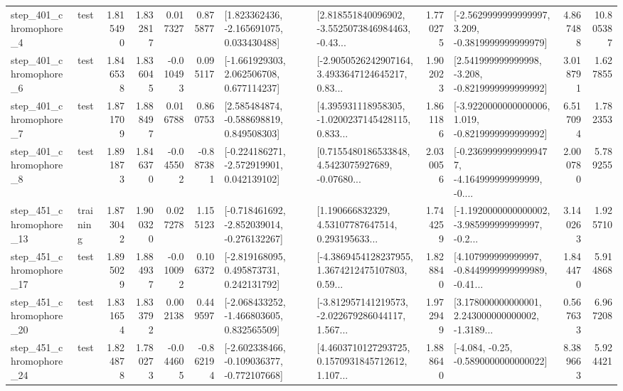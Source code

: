 \begin{tabular}{llrrrrllrlrr}
   step\_401\_chromophore\_4 &      test &      1.815490 &    1.832817 &      0.017327 &  0.875877 &    [1.823362436, -2.165691075, 0.033430488] &  [2.818551840096902, -3.5525073846984463, -0.43... &       1.770275 &  [-2.5629999999999997, 3.209, -0.3819999999999979] &            4.867488 &         10.805387 \\
   step\_401\_chromophore\_6 &      test &      1.846538 &    1.836045 &     -0.010493 &  0.095117 &    [-1.661929303, 2.062506708, 0.677114237] &  [-2.9050526242907164, 3.4933647124645217, 0.83... &       1.902023 &   [2.541999999999998, -3.208, -0.8219999999999992] &            3.018791 &          1.627855 \\
   step\_401\_chromophore\_7 &      test &      1.871709 &    1.888497 &      0.016788 &  0.860753 &    [2.585484874, -0.588698819, 0.849508303] &  [4.395931118958305, -1.0200237145428115, 0.833... &       1.861186 &  [-3.9220000000000006, 1.019, -0.8219999999999992] &            6.517094 &          1.782353 \\
   step\_401\_chromophore\_8 &      test &      1.891873 &    1.846370 &     -0.045502 & -0.887381 &   [-0.224186271, -2.572919901, 0.042139102] &  [0.7155480186533848, 4.5423075927689, -0.07680... &       2.030056 &  [-0.23699999999999477, -4.164999999999999, -0.... &            2.000780 &          5.789255 \\
  step\_451\_chromophore\_13 &  training &      1.873042 &    1.900320 &      0.027278 &  1.155123 &  [-0.718461692, -2.852039014, -0.276132267] &  [1.190666832329, 4.53107787647514, 0.293195633... &       1.744259 &  [-1.1920000000000002, -3.985999999999997, -0.2... &            3.140263 &          1.925710 \\
  step\_451\_chromophore\_17 &      test &      1.895029 &    1.884937 &     -0.010092 &  0.106372 &    [-2.819168095, 0.495873731, 0.242131792] &  [-4.3869454128237955, 1.3674212475107803, 0.59... &       1.828840 &  [4.107999999999997, -0.8449999999999989, -0.41... &            1.844470 &          5.914868 \\
  step\_451\_chromophore\_20 &      test &      1.831654 &    1.833792 &      0.002138 &  0.449597 &   [-2.068433252, -1.466803605, 0.832565509] &  [-3.812957141219573, -2.022679286044117, 1.567... &       1.972949 &  [3.178000000000001, 2.243000000000002, -1.3189... &            0.567633 &          6.967208 \\
  step\_451\_chromophore\_24 &      test &      1.824878 &    1.780273 &     -0.044605 & -0.862194 &  [-2.602338466, -0.109036377, -0.772107668] &  [4.4603710127293725, 0.1570931845712612, 1.107... &       1.888640 &               [-4.084, -0.25, -0.5890000000000022] &            8.389663 &          5.924421 \\

\end{tabular}
